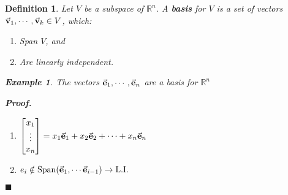 \documentclass[12pt, a4paper]{article}
\newtheorem{df}{Definition}[subsection]
\newtheorem{eg}{Example}[subsection]
\newenvironment*{prf}{\par\indent\textbf{\textit{Proof. }}}{\hfill $\blacksquare$\par}
\def\R{{\mathbb{R}}}
\def\Span{\mathrm{Span}}
\def\vecv{\va{v}}
\def\vece{\va{e}}
\def\LI{\mathrm{L.I.}}
\begin{document}
\begin{df}
	Let $V$ be a subspace of $\R^n$. A \textbf{basis} for $V$ is a set of vectors $\vecv_1,\cdots,\vecv_k\in V$, which: 
	\begin{enumerate}
		\item Span $V$, and
		\item Are linearly independent. 
	\end{enumerate}
	\begin{eg}
		The vectors $\vece_1,\cdots,\vece_n$ are a basis for $\R^n$\\
		\begin{prf}
			\begin{enumerate}
				\item $\begin{bmatrix}x_1\\\vdots\\x_n\end{bmatrix}=x_1\vece_1+x_2\vece_2+\cdots+x_n\vece_n$
				\item $e_i\notin\Span(\vece_1,\cdots\vece_{i-1})\rightarrow\LI$	
			\end{enumerate}
		\end{prf}
	\end{eg}
\end{df}
\end{document}
